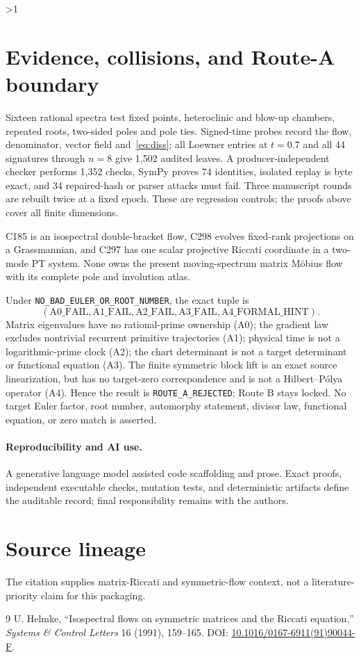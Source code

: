 \documentclass[10pt]{article}
\providecommand{\CRevisionRound}{2}
\begin{document}
\ifnum\CRevisionRound>1
\section{Evidence, collisions, and Route-A boundary}
Sixteen rational spectra test fixed points, heteroclinic and blow-up
chambers, repeated roots, two-sided poles and pole ties.  Signed-time probes
record the flow, denominator, vector field and~\eqref{eq:diss}; all Loewner
entries at $t=0.7$ and all 44 signatures through $n=8$ give 1,502 audited
leaves.  A producer-independent checker performs 1,352 checks,
SymPy proves 74 identities, isolated replay is byte exact, and 34
repaired-hash or parser attacks must fail.  Three manuscript rounds are
rebuilt twice at a fixed epoch.  These are regression controls; the proofs
above cover all finite dimensions.

C185 is an isospectral double-bracket flow, C298 evolves fixed-rank
projections on a Grassmannian, and C297 has one scalar projective Riccati
coordinate in a two-mode PT system.  None owns the present moving-spectrum
matrix M\"obius flow with its complete pole and involution atlas.

Under \texttt{NO\_BAD\_EULER\_OR\_ROOT\_NUMBER}, the exact tuple is
\[
 (\mathrm{A0\_FAIL},\mathrm{A1\_FAIL},\mathrm{A2\_FAIL},
  \mathrm{A3\_FAIL},\mathrm{A4\_FORMAL\_HINT}).
\]
Matrix eigenvalues have no rational-prime ownership (A0); the gradient law
excludes nontrivial recurrent primitive trajectories (A1); physical time is
not a logarithmic-prime clock (A2); the chart determinant is not a target
determinant or functional equation (A3).  The finite symmetric block lift is
an exact source linearization, but has no target-zero correspondence and is
not a Hilbert--P\'olya operator (A4).  Hence the result is
\texttt{ROUTE\_A\_REJECTED}; Route B stays locked.  No target Euler factor,
root number, automorphy statement, divisor law, functional equation, or zero
match is asserted.

\paragraph{Reproducibility and AI use.}
A generative language model assisted code scaffolding and prose.  Exact
proofs, independent executable checks, mutation tests, and deterministic
artifacts define the auditable record; final responsibility remains with
the authors.
\fi

\section*{Source lineage}
The citation supplies matrix-Riccati and symmetric-flow context, not a
literature-priority claim for this packaging.
\begin{thebibliography}{9}
 U. Helmke,
``Isospectral flows on symmetric matrices and the Riccati equation,''
\emph{Systems \& Control Letters} 16 (1991), 159--165.
DOI: \href{https://doi.org/10.1016/0167-6911(91)90044-F}
{10.1016/0167-6911(91)90044-F}.
\end{thebibliography}
\end{document}

